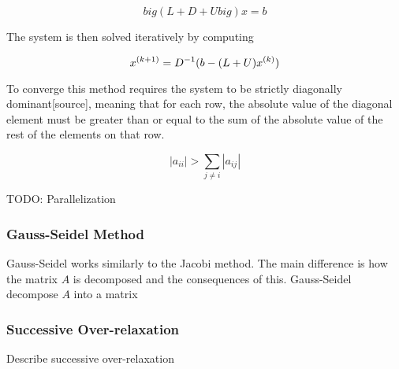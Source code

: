 $$ big( L+D+U big) x = b $$

The system is then solved iteratively by computing 

$$x^{(k+1)} = {D}^{-1}(b - (L+U)x^{(k)})$$

To converge this method requires the system to be strictly diagonally dominant[source],
meaning that for each row, the absolute value of the diagonal element must be
greater than or equal to the sum of the absolute value of the rest of the
elements on that row.

$$|a_{ii}| > \sum_{j \neq i} |a_{ij}|$$

TODO: Parallelization

\subsubsection*{Gauss-Seidel Method}

Gauss-Seidel works similarly to the Jacobi method. The main difference is how the matrix $A$ is decomposed and the consequences of this. Gauss-Seidel decompose $A$ into a matrix 

\subsubsection*{Successive Over-relaxation}

Describe successive over-relaxation
